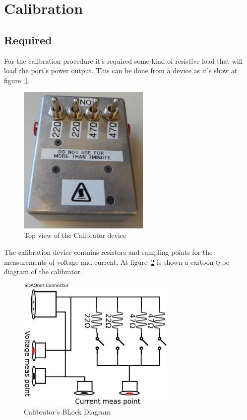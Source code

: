 \newpage
\section{Calibration}
\subsection{Required}
For the calibration procedure it's required some kind of resistive load that will load the port's power output.
This can be done from a device as it's show at figure~\ref{fig:calibrator_top}.
\begin{figure}[h!]
	\centering
	\includegraphics[width=2.5in]{./pics/calibrator_top.jpg}
	\caption{Top view of the Calibrator device}
	\label{fig:calibrator_top}
\end{figure}

The calibration device contains resistors and sampling points for the measurements of voltage and current.
At figure~\ref{fig:calibrator_block} is shown a cartoon type diagram of the calibrator.
\begin{figure}[h!]
	\centering
	\includegraphics[width=3in]{./Artwork/calibrator_block.png}
	\caption{Calibrator's BLock Diagram}
	\label{fig:calibrator_block}
\end{figure}

